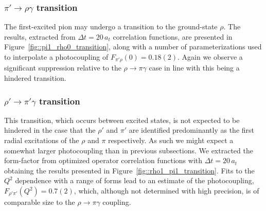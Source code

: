 \subsubsection{$\pi' \rightarrow \rho \gamma$ transition}

The first-excited pion may undergo a transition to the ground-state $\rho$. The results, extracted from $\Delta t = 20 \, a_t$ correlation functions, are presented in Figure~\ref{fig::pi1_rho0_transition}, along with a number of parameterizations used to interpolate a photocoupling of $F_{\pi' \rho}(0) = 0.18(2)$. Again we observe a significant suppression relative to the $\rho \to \pi \gamma$ case in line with this being a hindered transition.








\subsubsection{$\rho' \rightarrow \pi' \gamma$ transition}

This transition, which occurs between excited states, is not expected to be hindered in the case that the $\rho'$ and $\pi'$ are identified predominantly as the first radial excitations of the $\rho$ and $\pi$ respectively. As such we might expect a somewhat larger photocoupling than in previous subsections. We extracted the form-factor from optimized operator correlation functions with $\Delta t = 20 \,a_t$ obtaining the results presented in Figure~\ref{fig::rho1_pi1_transition}. Fits to the $Q^2$ dependence with a range of forms lead to an estimate of the photocoupling, $F_{\rho' \pi'}(Q^2) = 0.7(2)$, which, although not determined with high precision, is of comparable size to the $\rho \to \pi \gamma$ coupling. 

